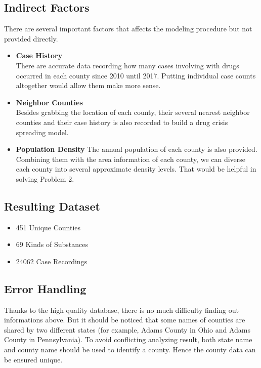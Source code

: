 \documentclass{mcmthesis}
\begin{document}
\subsection{Indirect Factors}
There are several important factors that affects the modeling procedure but not provided directly. 
\begin{itemize}
	\item \textbf{Case History}\\
	There are accurate data recording how many cases involving with drugs occurred in each county since 2010 until 2017. Putting individual case counts altogether would allow them make more sense.
	\item \textbf{Neighbor Counties}\\
	Besides grabbing the location of each county, their several nearest neighbor counties and their case history is also recorded to build a drug crisis spreading model.
	\item \textbf{Population Density}
	The annual population of each county is also provided. Combining them with the area information of each county, we can diverse each county into  several approximate density levels. That would be helpful in solving Problem 2.
\end{itemize}

\subsection{Resulting Dataset}
\begin{itemize}
	\item 451 Unique Counties
	\item 69 Kinds of Substances
	\item 24062 Case Recordings
\end{itemize}

\subsection{Error Handling}
Thanks to the high quality database, there is no much difficulty finding out informations above. But it should be noticed that some names of counties are shared by two different states (for example, Adams County in Ohio and Adams County in Pennsylvania). To avoid conflicting analyzing result, both state name and county name should be used to identify a county. Hence the county data can be ensured unique.
\end{document}
